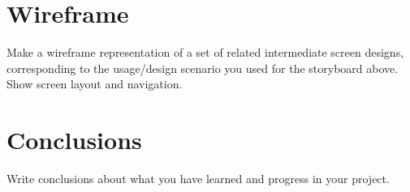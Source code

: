 \documentclass[12pt]{scrartcl}
\begin{document}
	

\section{Wireframe}

	Make a wireframe representation of a set of related intermediate screen designs, corresponding to the usage/design scenario you used for the storyboard above.  Show screen layout and navigation.
	
	
	
\section{Conclusions}

	Write conclusions about what you have learned and progress in your project.
	
\end{document}
